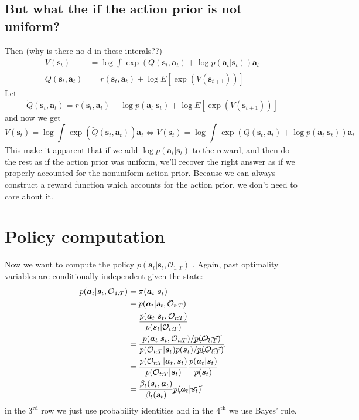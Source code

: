 \documentclass{report}
\begin{document}
\subsection{But what the if the action prior is not uniform?}
Then  (why is there no d in these interals??)
\begin{align}
		V (\bm{s}_{t}) &= \log 
		\int_{}^{} \exp (Q (\bm{s}_{t}, \bm{a}_{t} ) + \log p (\bm{a}_{t}| \bm{s}_{t} ) ) \bm{a}_{t}\\
		Q (\bm{s}_{t}, \bm{a}_{t} ) &= r (\bm{s}_{t}, \bm{a}_{t} ) + \log E \left[ \exp (V (\bm{s}_{t+1})) \right] 
\end{align}
Let 
\begin{equation}
		\tilde{Q} (\bm{s}_{t}, \bm{a}_{t} ) = r (\bm{s}_{t}, \bm{a}_{t} ) + \log p (\bm{a}_{t}| \bm{s}_{t} ) + \log E \left[ \exp (V (\bm{s}_{t+1})) \right] 
\end{equation}
and now we get
\begin{equation}
		V (\bm{s}_{t}) = \log \int_{}^{} \exp (\tilde{Q} (\bm{s}_{t}, \bm{a}_{t} )) \bm{a}_{t}
		\iff 
		V (\bm{s}_{t}) = \log \int_{}^{} \exp (Q (\bm{s}_{t}, \bm{a}_{t} ) + \log p (\bm{a}_{t}| \bm{s}_{t} ) ) \bm{a}_{t}
\end{equation}
This make it apparent that if we add $ \log p (\bm{a}_{t}| \bm{s}_{t} )  $ to the reward,
and then do the rest as if the action prior was uniform,
we'll recover the right answer as if we properly accounted for the nonuniform action prior.
Because we can always construct a reward function which accounts for the action prior, we don't 
need to care about it.

\section{Policy computation}
Now we want to compute the policy $ p (\bm{a}_{t}| \bm{s}_{t}, \mathcal{O}_{ 1:T } )  $ .
Again, past optimality variables are conditionally independent given the state:
\begin{align}
p (\bm{a}_{t}| \bm{s}_{t}, \mathcal{O}_{ 1:T } ) &= \pi (\bm{a}_{t}| \bm{s}_{t} ) \\
&= p (\bm{a}_{t}| \bm{s}_{t}, \mathcal{O}_{ t:T } ) \\
&= \frac{p (\bm{a}_{t}| \bm{s}_{t}, \mathcal{O}_{ t:T } )}{p (\bm{s}_{t}| \mathcal{O}_{ t:T })} \\
&= \frac{p (\bm{a}_{t}| \bm{s}_{t}, \mathcal{O}_{ t:T } )/ \cancel{p (\mathcal{O}_{ t:T })}}{p (\mathcal{O}_{ t:T }|\bm{s}_{t}) p (\bm{s}_{t}) / \cancel{p (\mathcal{O}_{ t:T }) } }\\
&= \frac{p (\mathcal{O}_{ t:T }|\bm{a}_{t}, \bm{s}_{t})}{p (\mathcal{O}_{ t:T }|\bm{s}_{t})}  \frac{p (\bm{a}_{t}| \bm{s}_{t} )}{p (\bm{s}_{t})} \\
&= \frac{\beta_{ t }(\bm{s}_{t}, \bm{a}_{t} )}{\beta_{ t } (\bm{s}_{t})} \cancel{p (\bm{a}_{t}| \bm{s}_{t} ) }
\end{align}
in the $ 3^{ \text{rd} }  $ row we just use probability identities and in the $ 4^{ \text{th} }  $ we use Bayes' rule.
\end{document}
